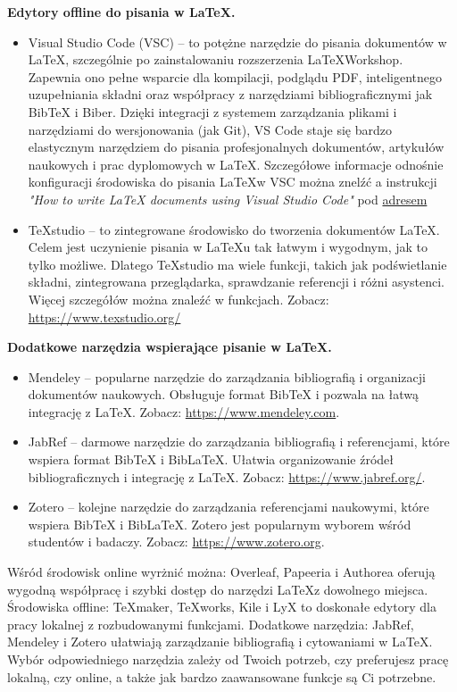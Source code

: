 \noindent \textbf{Edytory offline do pisania w \LaTeX.}

\begin{itemize}
      \item Visual Studio Code (VSC) -- to potężne narzędzie do pisania dokumentów w \LaTeX, szczególnie po zainstalowaniu rozszerzenia \LaTeX Workshop. Zapewnia ono pełne wsparcie dla kompilacji, podglądu PDF, inteligentnego uzupełniania składni oraz współpracy z narzędziami bibliograficznymi jak BibTeX i Biber. Dzięki integracji z systemem zarządzania plikami i narzędziami do wersjonowania (jak Git), VS Code staje się bardzo elastycznym narzędziem do pisania profesjonalnych dokumentów, artykułów naukowych i prac dyplomowych w \LaTeX. Szczegółowe informacje odnośnie konfiguracji środowiska do pisania \LaTeX w VSC można znelźć a instrukcji \textit{"How to write LaTeX documents using Visual Studio Code"} pod \href{https://www.geekering.com/programming-languages/filipesalgueiro/how-to-write-latex-documents-using-visual-studio-code/}{adresem}
      \item TeXstudio -- to zintegrowane środowisko do tworzenia dokumentów LaTeX. Celem jest uczynienie pisania w LaTeXu tak łatwym i wygodnym, jak to tylko możliwe. Dlatego TeXstudio ma wiele funkcji, takich jak podświetlanie składni, zintegrowana przeglądarka, sprawdzanie referencji i różni asystenci. Więcej szczegółów można znaleźć w funkcjach. Zobacz: \url{https://www.texstudio.org/}
\end{itemize}

\noindent \textbf{Dodatkowe narzędzia wspierające pisanie w \LaTeX.}
\begin{itemize}
      \item Mendeley -- popularne narzędzie do zarządzania bibliografią i organizacji dokumentów naukowych. Obsługuje format BibTeX i pozwala na łatwą integrację z \LaTeX. Zobacz: \url{https://www.mendeley.com}.
      \item JabRef -- darmowe narzędzie do zarządzania bibliografią i referencjami, które wspiera format BibTeX i BibLaTeX. Ułatwia organizowanie źródeł bibliograficznych i integrację z \LaTeX. Zobacz: \url{https://www.jabref.org/}.
      \item Zotero -- kolejne narzędzie do zarządzania referencjami naukowymi, które wspiera BibTeX i BibLaTeX. Zotero jest popularnym wyborem wśród studentów i badaczy. Zobacz: \url{https://www.zotero.org}.
\end{itemize}

Wśród środowisk online wyrżnić można: Overleaf, Papeeria i Authorea oferują wygodną współpracę i szybki dostęp do narzędzi \LaTeX z dowolnego miejsca. Środowiska offline: TeXmaker, TeXworks, Kile i LyX to doskonałe edytory dla pracy lokalnej z rozbudowanymi funkcjami. Dodatkowe narzędzia: JabRef, Mendeley i Zotero ułatwiają zarządzanie bibliografią i cytowaniami w \LaTeX. Wybór odpowiedniego narzędzia zależy od Twoich potrzeb, czy preferujesz pracę lokalną, czy online, a także jak bardzo zaawansowane funkcje są Ci potrzebne.


